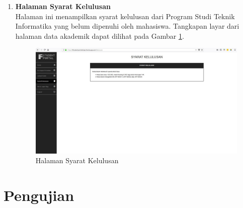 \begin{enumerate}
				\item\textbf{Halaman Syarat Kelulusan}\\
				Halaman ini menampilkan syarat kelulusan dari Program Studi Teknik Informatika yang belum dipenuhi oleh mahasiswa. Tangkapan layar dari halaman data akademik dapat dilihat pada Gambar \ref{fig:5_halaman_syarat_kelulusan}.
				\begin{figure}[H]
						\centering
						\includegraphics[scale=0.34]{Gambar/halaman_syarat_kelulusan}
						\caption{Halaman Syarat Kelulusan} 
						\label{fig:5_halaman_syarat_kelulusan}
					\end{figure}
		\end{enumerate}
		
\section{Pengujian}